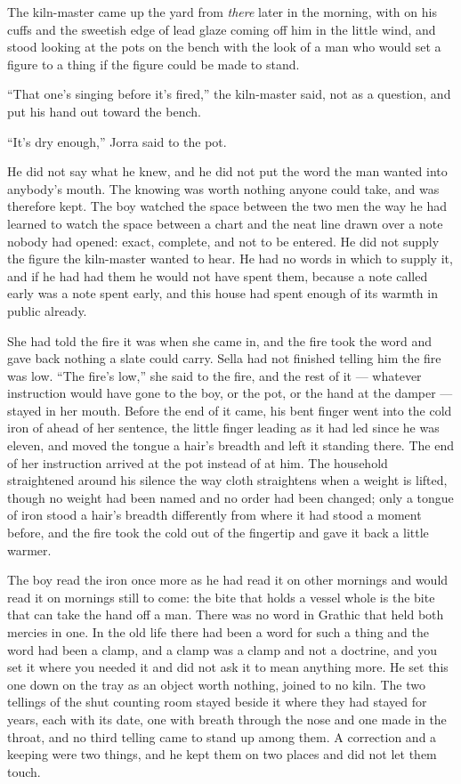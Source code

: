 The kiln-master came up the yard from \emph{there} later in the morning, with  on his cuffs and the sweetish edge of lead glaze coming off him in the little wind, and stood looking at the pots on the bench with the look of a man who would set a figure to a thing if the figure could be made to stand.

“That one's singing before it's fired,” the kiln-master said, not as a question, and put his hand out toward the bench.

“It's dry enough,” Jorra said to the pot.

He did not say what he knew, and he did not put the word the man wanted into anybody's mouth. The knowing was worth nothing anyone could take, and was therefore kept. The boy watched the space between the two men the way he had learned to watch the space between a chart and the neat line drawn over a note nobody had opened: exact, complete, and not to be entered. He did not supply the figure the kiln-master wanted to hear. He had no words in which to supply it, and if he had had them he would not have spent them, because a note called early was a note spent early, and this house had spent enough of its warmth in public already.

\scenebreak

She had told the fire it was  when she came in, and the fire took the word and gave back nothing a slate could carry. Sella had not finished telling him the fire was low. “The fire's low,” she said to the fire, and the rest of it --- whatever instruction would have gone to the boy, or the pot, or the hand at the damper --- stayed in her mouth. Before the end of it came, his bent finger went into the cold iron of  ahead of her sentence, the little finger leading as it had led since he was eleven, and moved the tongue a hair's breadth and left it standing there. The end of her instruction arrived at the pot instead of at him. The household straightened around his silence the way cloth straightens when a weight is lifted, though no weight had been named and no order had been changed; only a tongue of iron stood a hair's breadth differently from where it had stood a moment before, and the fire took the cold out of the fingertip and gave it back a little warmer.

The boy read the iron once more as he had read it on other mornings and would read it on mornings still to come: the bite that holds a vessel whole is the bite that can take the hand off a man. There was no word in Grathic that held both mercies in one. In the old life there had been a word for such a thing and the word had been a clamp, and a clamp was a clamp and not a doctrine, and you set it where you needed it and did not ask it to mean anything more. He set this one down on the tray as an object worth nothing, joined to no kiln. The two tellings of the shut counting room stayed beside it where they had stayed for years, each with its date, one with breath through the nose and one made in the throat, and no third telling came to stand up among them. A correction and a keeping were two things, and he kept them on two places and did not let them touch.

